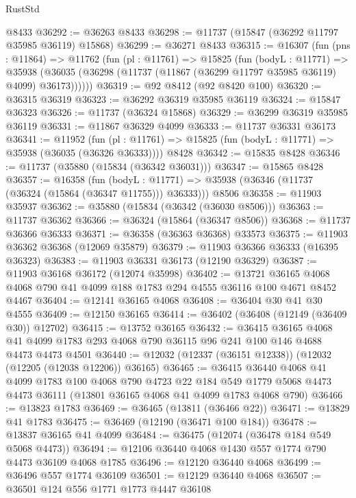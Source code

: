 \begin{lexlean}{RustStd}
\begin{coremodule}
    @8433
@36292 := @36263 @8433
@36298 := @11737 (@15847 (@36292 @11797 @35985 @36119) @15868)
@36299 := @36271 @8433
@36315 := @16307
    (fun (pns : @11864) =>
    @11762
      (fun (pl : @11761) =>
      @15825
        (fun (bodyL : @11771) =>
        @35938 (@36035 (@36298 (@11737 (@11867 (@36299 @11797 @35985 @36119) @4099) @36173))))))
@36319 := @92 @8412 (@92 @8420 @100)
@36320 := @36315 @36319
@36323 := @36292 @36319 @35985 @36119
@36324 := @15847 @36323
@36326 := @11737 (@36324 @15868)
@36329 := @36299 @36319 @35985 @36119
@36331 := @11867 @36329 @4099
@36333 := @11737 @36331 @36173
@36341 := @11952
    (fun (pl : @11761) => @15825 (fun (bodyL : @11771) => @35938 (@36035 (@36326 @36333))))
    @8428
@36342 := @15835 @8428
@36346 := @11737 (@35880 (@15834 (@36342 @36031)))
@36347 := @15865 @8428
@36357 := @16358
    (fun (bodyL : @11771) => @35938 (@36346 (@11737 (@36324 (@15864 (@36347 @11755))) @36333)))
    @8506
@36358 := @11903 @35937
@36362 := @35880 (@15834 (@36342 (@36030 @8506)))
@36363 := @11737 @36362
@36366 := @36324 (@15864 (@36347 @8506))
@36368 := @11737 @36366 @36333
@36371 := @36358 (@36363 @36368) @33573
@36375 := @11903 @36362 @36368 (@12069 @35879)
@36379 := @11903 @36366 @36333 (@16395 @36323)
@36383 := @11903 @36331 @36173 (@12190 @36329)
@36387 := @11903 @36168 @36172 (@12074 @35998)
@36402 := @13721
    @36165
    @4068
    @4068
    @790
    @41
    @4099
    @188
    @1783
    @294
    @4555
    @36116
    @100
    @4671
    @8452
    @4467
@36404 := @12141 @36165 @4068
@36408 := @36404 @30 @41 @30 @4555
@36409 := @12150 @36165
@36414 := @36402 (@36408 (@12149 (@36409 @30)) @12702)
@36415 := @13752 @36165
@36432 := @36415
    @36165
    @4068
    @41
    @4099
    @1783
    @293
    @4068
    @790
    @36115
    @96
    @241
    @100
    @146
    @4688
    @4473
    @4473
    @4501
@36440 := @12032 (@12337 (@36151 @12338)) (@12032 (@12205 (@12038 @12206)) @36165)
@36465 := @36415
    @36440
    @4068
    @41
    @4099
    @1783
    @100
    @4068
    @790
    @4723
    @22
    @184
    @549
    @1779
    @5068
    @4473
    @4473
    @36111
    (@13801 @36165 @4068 @41 @4099 @1783 @4068 @790)
@36466 := @13823 @1783
@36469 := @36465 (@13811 (@36466 @22))
@36471 := @13829 @41 @1783
@36475 := @36469 (@12190 (@36471 @100 @184))
@36478 := @13837 @36165 @41 @4099
@36484 := @36475 (@12074 (@36478 @184 @549 @5068 @4473))
@36494 := @12106 @36440 @4068 @1430 @557 @1774 @790 @4473 @36109 @4068 @1785
@36496 := @12120 @36440 @4068
@36499 := @36496 @557 @1774 @36109
@36501 := @12129 @36440 @4068
@36507 := @36501 @124 @556 @1771 @1773 @4447 @36108

\end{coremodule}
\end{lexlean}

